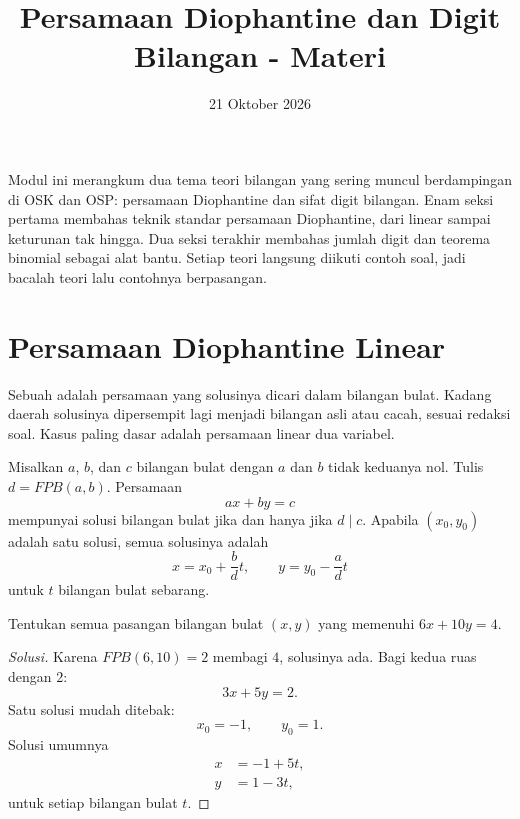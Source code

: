 \documentclass[12pt]{scrartcl}
\title{Persamaan Diophantine dan Digit Bilangan - Materi}
\date{21 Oktober 2026}
\begin{document}
\maketitle

\renewcommand*\contentsname{Daftar Isi}
\tableofcontents

\newpage

Modul ini merangkum dua tema teori bilangan yang sering muncul berdampingan
di OSK dan OSP: persamaan Diophantine dan sifat digit bilangan.
Enam seksi pertama membahas teknik standar persamaan Diophantine,
dari linear sampai keturunan tak hingga.
Dua seksi terakhir membahas jumlah digit dan teorema binomial sebagai alat bantu.
Setiap teori langsung diikuti contoh soal,
jadi bacalah teori lalu contohnya berpasangan.

\section{Persamaan Diophantine Linear}

Sebuah  adalah persamaan
yang solusinya dicari dalam bilangan bulat.
Kadang daerah solusinya dipersempit lagi menjadi bilangan asli atau cacah,
sesuai redaksi soal.
Kasus paling dasar adalah persamaan linear dua variabel.

\begin{theorem}
Misalkan $a$, $b$, dan $c$ bilangan bulat dengan $a$ dan $b$ tidak keduanya nol.
Tulis $d = FPB(a, b)$. Persamaan
\[ ax + by = c \]
mempunyai solusi bilangan bulat jika dan hanya jika $d \mid c$.
Apabila $(x_0, y_0)$ adalah satu solusi, semua solusinya adalah
\[ x = x_0 + \frac{b}{d}t, \qquad y = y_0 - \frac{a}{d}t \]
untuk $t$ bilangan bulat sebarang.
\end{theorem}

\begin{example}
Tentukan semua pasangan bilangan bulat $(x, y)$ yang memenuhi $6x + 10y = 4$.
\end{example}
\begin{proof}[Solusi]
Karena $FPB(6, 10) = 2$ membagi $4$, solusinya ada.
Bagi kedua ruas dengan $2$:
\[ 3x + 5y = 2. \]
Satu solusi mudah ditebak:
\[ x_0 = -1, \qquad y_0 = 1. \]
Solusi umumnya
\begin{align*}
x &= -1 + 5t, \\
y &= 1 - 3t,
\end{align*}
untuk setiap bilangan bulat $t$.
\end{proof}
\end{document}
